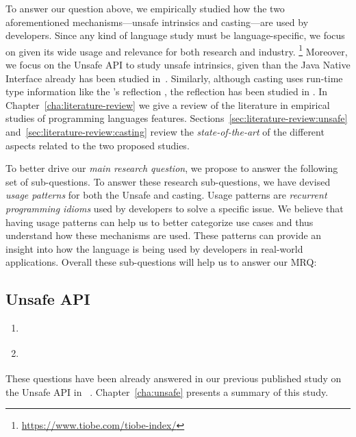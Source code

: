 To answer our question above,
we empirically studied how the two aforementioned mechanisms---unsafe intrinsics and casting---are used by developers.
Since any kind of language study must be language-specific,
we focus on \java{} given its wide usage and relevance for both
research and industry.%
\footnote{\url{https://www.tiobe.com/tiobe-index/}}
Moreover, we focus on the \java{} Unsafe API to study unsafe intrinsics,
given than the Java Native Interface already has been studied
in~\cite{tanSafeJavaNative2006,tanEmpiricalSecurityStudy2008,kondohFindingBugsJava2008,sunNativeGuardProtectingAndroid2014,liFindingBugsExceptional2009}.
Similarly, although casting uses run-time type information like
the \java's reflection \api{},
the reflection \api{} has been studied in
\cite{livshitsImprovingSoftwareSecurity2006,livshitsReflectionAnalysisJava2005,landmanChallengesStaticAnalysis2017}.
In Chapter~\ref{cha:literature-review} we give a review of the literature in empirical studies of programming languages features.
Sections~\ref{sec:literature-review:unsafe} and~\ref{sec:literature-review:casting} review the \emph{state-of-the-art} of the different aspects related to the two proposed studies.

To better drive our \emph{main research question},
we propose to answer the following set of sub-questions.
To answer these research sub-questions,
we have devised \emph{usage patterns} for both the Unsafe \api{} and casting.
Usage patterns are \emph{recurrent programming idioms} used by developers to solve a specific issue.
We believe that having usage patterns can help us to better categorize use cases and
thus understand how these mechanisms are used.
These patterns can provide an insight into how the language is being used by developers in real-world applications.
Overall these sub-questions will help us to answer our MRQ:

\subsection*{Unsafe API}

\begin{enumerate}[label=$RQ/U\arabic*:$,leftmargin=3.4\parindent]
\item {\bf \urqA} \urqAdesc{}
\item {\bf \urqB} \urqBdesc{}
\end{enumerate}

These questions have been already answered in our previous published
study on the Unsafe API in \java{}~\citep{mastrangeloUseYourOwn2015}.
Chapter~\ref{cha:unsafe} presents a summary of this study.

